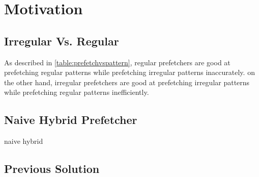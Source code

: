 \section{Motivation}
\label{sec:motivation}


  \subsection{Irregular Vs. Regular}
  \label{sec:irrVsre}
  As described in \ref{table:prefetchvspattern}, regular prefetchers are good at prefetching regular patterns while prefetching irregular patterns inaccurately. on the other hand, irregular prefetchers are good at prefetching irregular patterns while prefetching regular patterns inefficiently.

  \subsection{Naive Hybrid Prefetcher}
  \label{sec:naivehy}
  naive hybrid


  \subsection{Previous Solution}
  \label{sec:PrevSol}